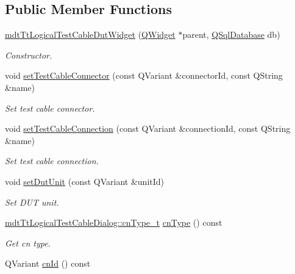 \subsection*{Public Member Functions}
\begin{DoxyCompactItemize}
\item 
\hyperlink{classmdt_tt_logical_test_cable_dut_widget_a0b4994d59497cc276180923914358391}{mdt\-Tt\-Logical\-Test\-Cable\-Dut\-Widget} (\hyperlink{class_q_widget}{Q\-Widget} $\ast$parent, \hyperlink{class_q_sql_database}{Q\-Sql\-Database} db)
\begin{DoxyCompactList}\small\item\em Constructor. \end{DoxyCompactList}\item 
void \hyperlink{classmdt_tt_logical_test_cable_dut_widget_a5aae77f249ae1fd251aae29e82517d7a}{set\-Test\-Cable\-Connector} (const Q\-Variant \&connector\-Id, const Q\-String \&name)
\begin{DoxyCompactList}\small\item\em Set test cable connector. \end{DoxyCompactList}\item 
void \hyperlink{classmdt_tt_logical_test_cable_dut_widget_afe3e657176c698cec7aa7fb70ba11cea}{set\-Test\-Cable\-Connection} (const Q\-Variant \&connection\-Id, const Q\-String \&name)
\begin{DoxyCompactList}\small\item\em Set test cable connection. \end{DoxyCompactList}\item 
void \hyperlink{classmdt_tt_logical_test_cable_dut_widget_afe9ac9845afc941d264bbe23c01e2675}{set\-Dut\-Unit} (const Q\-Variant \&unit\-Id)
\begin{DoxyCompactList}\small\item\em Set D\-U\-T unit. \end{DoxyCompactList}\item 
\hyperlink{classmdt_tt_logical_test_cable_dialog_a3ca0cca0e179adbc5d6a024eb8ec00f8}{mdt\-Tt\-Logical\-Test\-Cable\-Dialog\-::cn\-Type\-\_\-t} \hyperlink{classmdt_tt_logical_test_cable_dut_widget_a71aa2a709acc41657bd1ca0762f79d7b}{cn\-Type} () const 
\begin{DoxyCompactList}\small\item\em Get cn type. \end{DoxyCompactList}\item 
Q\-Variant \hyperlink{classmdt_tt_logical_test_cable_dut_widget_a1cabba0b94b634268f93717b05c3a70d}{cn\-Id} () const 

\end{DoxyCompactItemize}
